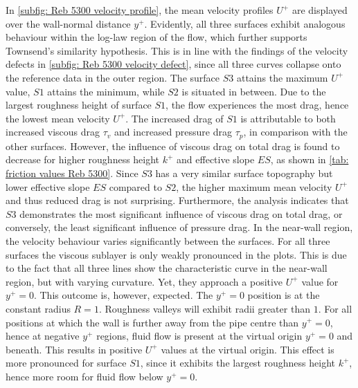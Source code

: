 In \autoref{subfig: Reb 5300 velocity profile}, the mean velocity profiles $U^+$ are displayed over the wall-normal distance $y^+$. 
Evidently, all three surfaces exhibit analogous behaviour within the log-law region of the flow, which further supports Townsend's similarity hypothesis.
This is in line with the findings of the velocity defects in \autoref{subfig: Reb 5300 velocity defect}, since all three curves collapse onto the reference data in the outer region.
The surface $S3$ attains the maximum $U^+$ value, $S1$ attains the minimum, while $S2$ is situated in between.
Due to the largest roughness height of surface $S1$, the flow experiences the most drag, hence the lowest mean velocity $U^+$.
The increased drag of $S1$ is attributable to both increased viscous drag $\tau_v$ and increased pressure drag $\tau_p$, in comparison with the other surfaces.
However, the influence of viscous drag on total drag is found to decrease for higher roughness height $k^+$ and effective slope $ES$, as shown in \autoref{tab: friction values Reb 5300}. 
Since $S3$ has a very similar surface topography but lower effective slope $ES$ compared to $S2$, the higher maximum mean velocity $U^+$ and thus reduced drag is not surprising.
Furthermore, the analysis indicates that $S3$ demonstrates the most significant influence of viscous drag on total drag, or conversely, the least significant influence of pressure drag.
In the near-wall region, the velocity behaviour varies significantly between the surfaces.
For all three surfaces the viscous sublayer is only weakly pronounced in the plots.
This is due to the fact that all three lines show the characteristic curve in the near-wall region, but with varying curvature.
Yet, they approach a positive $U^+$ value for $y^+ = 0$.
This outcome is, however, expected.
The $y^+ = 0$ position is at the constant radius $R = 1$.
Roughness valleys will exhibit radii greater than $1$.
For all positions at which the wall is further away from the pipe centre than $y^+ = 0$, hence at negative $y^+$ regions, fluid flow is present at the virtual origin $y^+ = 0$ and beneath.
This results in positive $U^+$ values at the virtual origin. 
This effect is more pronounced for surface $S1$, since it exhibits the largest roughness height $k^+$, hence more room for fluid flow below $y^+ = 0$.

